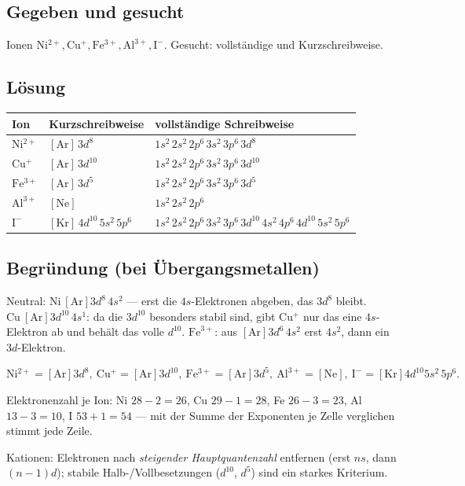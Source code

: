 
\subsection*{Gegeben und gesucht}
Ionen $\mathrm{Ni^{2+}, Cu^+, Fe^{3+}, Al^{3+}, I^-}$. Gesucht: vollständige und
Kurzschreibweise.

\subsection*{Lösung}
\begin{center}
\begin{tabular}{@{}lll@{}}
  Ion & Kurzschreibweise & vollständige Schreibweise \\
  \hline
  $\mathrm{Ni^{2+}}$ & $[\mathrm{Ar}]\,3d^8$ &
     $1s^2\,2s^2\,2p^6\,3s^2\,3p^6\,3d^8$ \\
  $\mathrm{Cu^+}$   & $[\mathrm{Ar}]\,3d^{10}$ &
     $1s^2\,2s^2\,2p^6\,3s^2\,3p^6\,3d^{10}$ \\
  $\mathrm{Fe^{3+}}$& $[\mathrm{Ar}]\,3d^5$ &
     $1s^2\,2s^2\,2p^6\,3s^2\,3p^6\,3d^5$ \\
  $\mathrm{Al^{3+}}$& $[\mathrm{Ne}]$ &
     $1s^2\,2s^2\,2p^6$ \\
  $\mathrm{I^-}$    & $[\mathrm{Kr}]\,4d^{10}\,5s^2\,5p^6$ &
     $1s^2\,2s^2\,2p^6\,3s^2\,3p^6\,3d^{10}\,4s^2\,4p^6\,4d^{10}\,5s^2\,5p^6$ \\
\end{tabular}
\end{center}

\subsection*{Begründung (bei Übergangsmetallen)}
Neutral: $\mathrm{Ni}\ [\mathrm{Ar}]3d^8\,4s^2$ --- erst die $4s$-Elektronen
abgeben, das $3d^8$ bleibt. $\mathrm{Cu}\ [\mathrm{Ar}]3d^{10}\,4s^1$: da die
$3d^{10}$ besonders stabil sind, gibt $\mathrm{Cu^+}$ nur das eine $4s$-Elektron
ab und behält das volle $d^{10}$. $\mathrm{Fe}^{3+}$: aus
$[\mathrm{Ar}]3d^6\,4s^2$ erst $4s^2$, dann ein $3d$-Elektron.

\begin{ergebnis}
$\mathrm{Ni^{2+}}=[\mathrm{Ar}]3d^8,\ \mathrm{Cu^+}=[\mathrm{Ar}]3d^{10},\
\mathrm{Fe^{3+}}=[\mathrm{Ar}]3d^5,\ \mathrm{Al^{3+}}=[\mathrm{Ne}],\
\mathrm{I^-}=[\mathrm{Kr}]4d^{10}5s^2\,5p^6.$
\end{ergebnis}

\begin{kontrolle}
Elektronenzahl je Ion: Ni $28-2=26$, Cu $29-1=28$, Fe $26-3=23$, Al $13-3=10$,
I $53+1=54$ --- mit der Summe der Exponenten je Zelle verglichen stimmt jede
Zeile.
\end{kontrolle}

\begin{merksatz}
Kationen: Elektronen nach \textit{steigender Hauptquantenzahl} entfernen
(erst $ns$, dann $(n-1)d$); stabile Halb-/Vollbesetzungen ($d^{10}$, $d^5$)
sind ein starkes Kriterium.
\end{merksatz}

